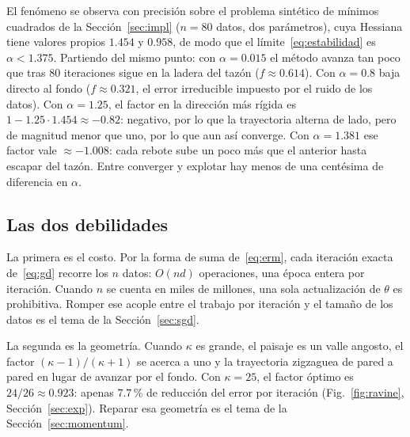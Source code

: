 El fenómeno se observa con precisión sobre el problema sintético de mínimos cuadrados de la Sección~\ref{sec:impl} ($n = 80$ datos, dos parámetros), cuya Hessiana tiene valores propios $1.454$ y $0.958$, de modo que el límite~\eqref{eq:estabilidad} es $\alpha < 1.375$. Partiendo del mismo punto: con $\alpha = 0.015$ el método avanza tan poco que tras 80 iteraciones sigue en la ladera del tazón ($f \approx 0.614$). Con $\alpha = 0.8$ baja directo al fondo ($f \approx 0.321$, el error irreducible impuesto por el ruido de los datos). Con $\alpha = 1.25$, el factor en la dirección más rígida es $1 - 1.25 \cdot 1.454 \approx -0.82$: negativo, por lo que la trayectoria alterna de lado, pero de magnitud menor que uno, por lo que aun así converge. Con $\alpha = 1.381$ ese factor vale $\approx -1.008$: cada rebote sube un poco más que el anterior hasta escapar del tazón. Entre converger y explotar hay menos de una centésima de diferencia en $\alpha$.

\subsection{Las dos debilidades}

La primera es el costo. Por la forma de suma de~\eqref{eq:erm}, cada iteración exacta de~\eqref{eq:gd} recorre los $n$ datos: $O(nd)$ operaciones, una época entera por iteración. Cuando $n$ se cuenta en miles de millones, una sola actualización de $\theta$ es prohibitiva. Romper ese acople entre el trabajo por iteración y el tamaño de los datos es el tema de la Sección~\ref{sec:sgd}.

La segunda es la geometría. Cuando $\kappa$ es grande, el paisaje es un valle angosto, el factor $(\kappa-1)/(\kappa+1)$ se acerca a uno y la trayectoria zigzaguea de pared a pared en lugar de avanzar por el fondo. Con $\kappa = 25$, el factor óptimo es $24/26 \approx 0.923$: apenas $7.7\,\%$ de reducción del error por iteración (Fig.~\ref{fig:ravine}, Sección~\ref{sec:exp}). Reparar esa geometría es el tema de la Sección~\ref{sec:momentum}.

